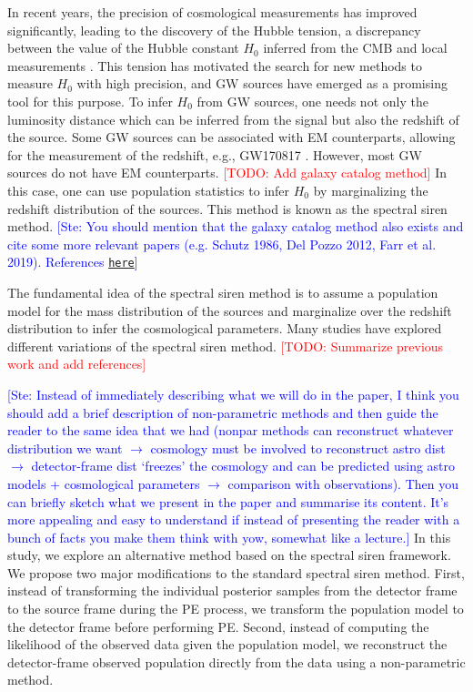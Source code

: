 \documentclass[aps,prd,twocolumn,superscriptaddress,preprintnumbers,nofootinbib,hidelinks]{revtex4-2}
\newcommand{\todo}[1]{\textcolor{red}{[TODO: #1]}}
\newcommand{\ste}[1]{\textcolor{blue}{[Ste: #1]}}
\begin{document}
In recent years, the precision of cosmological measurements has improved significantly, leading to the discovery of the Hubble tension, a discrepancy between the value of the Hubble constant $H_0$ inferred from the \ac{CMB} \citep{Planck:2018vyg} and local measurements \citep{Riess:2021jrx}.
This tension has motivated the search for new methods to measure $H_0$ with high precision, and \ac{GW} sources have emerged as a promising tool for this purpose.
To infer $H_0$ from \ac{GW} sources, one needs not only the luminosity distance which can be inferred from the signal but also the redshift of the source.
Some \ac{GW} sources can be associated with \ac{EM} counterparts, allowing for the measurement of the redshift, e.g., GW170817 \citep{LIGOScientific:2017adf, Guidorzi:2017ogy}.
However, most \ac{GW} sources do not have \ac{EM} counterparts. \todo{Add galaxy catalog method}
In this case, one can use population statistics to infer $H_0$ by marginalizing the redshift distribution of the sources.
This method is known as the spectral siren method\citep{You:2020wju, Mastrogiovanni:2021wsd, LIGOScientific:2021aug, Ezquiaga:2022zkx}.
\ste{You should mention that the galaxy catalog method also exists and cite some more relevant papers (e.g. Schutz 1986, Del Pozzo 2012, Farr et al. 2019). References \texttt{\href{ https://onlinelibrary.wiley.com/doi/pdf/10.1002/andp.202200180}{here}}}

The fundamental idea of the spectral siren method is to assume a population model for the mass distribution of the sources and marginalize over the redshift distribution to infer the cosmological parameters.
Many studies have explored different variations of the spectral siren method.
\todo{Summarize previous work and add references}

\ste{Instead of immediately describing what we will do in the paper, I think you should add a brief description of non-parametric methods and then guide the reader to the same idea that we had (nonpar methods can reconstruct whatever distribution we want $\rightarrow$ cosmology must be involved to reconstruct astro dist $\rightarrow$ detector-frame dist `freezes' the cosmology and can be predicted using astro models + cosmological parameters $\rightarrow$ comparison with observations). Then you can briefly sketch what we present in the paper and summarise its content. It's more appealing and easy to understand if instead of presenting the reader with a bunch of facts you make them think with yow, somewhat like a lecture.}
In this study, we explore an alternative method based on the spectral siren framework.
We propose two major modifications to the standard spectral siren method.
First, instead of transforming the individual posterior samples from the detector frame to the source frame during the \ac{PE} process, we transform the population model to the detector frame before performing \ac{PE}.
Second, instead of computing the likelihood of the observed data given the population model, we reconstruct the detector-frame observed population directly from the data using a non-parametric method.
\end{document}
